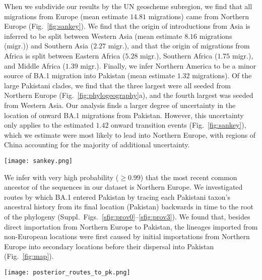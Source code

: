 When we subdivide our results by the UN geoscheme subregion, we find that all migrations from Europe (mean estimate $14.81$ migrations) came from Northern Europe (Fig.~\ref{fig:sankey}).
We find that the origin of introductions from Asia is inferred to be split between Western Asia (mean estimate $8.16$ migrations (migr.)) and Southern Asia ($2.27$ migr.), and that the origin of migrations from Africa is split between Eastern Africa ($5.28$ migr.), Southern Africa ($1.75$ migr.), and Middle Africa ($1.39$ migr.).
Finally, we infer Northern America to be a minor source of BA.1 migration into Pakistan (mean estimate $1.32$ migrations).
Of the large Pakistani clades, we find that the three largest were all seeded from Northern Europe (Fig.~\ref{fig:phylogeography}a), and the fourth largest was seeded from Western Asia.
Our analysis finds a larger degree of uncertainty in the location of onward BA.1 migrations from Pakistan. However, this uncertainty only applies to the estimated $1.42$ onward transition events (Fig.~\ref{fig:sankey}), which we estimate were most likely to lead into Northern Europe, with regions of China accounting for the majority of additional uncertainty.

\begin{figure*}[ht]
   \centering
   \texttt{[image: sankey.png]}
    \caption[BA.1 migration history by location]{Sankey diagram illustrating inferred BA.1 migrations into (mean estimate $35.12$ migrations) and out of (mean estimate $1.42$ migrations) Pakistan. Northern Europe is the source of all inferred migrations to Pakistan from Europe, representing a plurality of importations from both a region and sub-region geographic resolutions.}
    \label{fig:sankey}
\end{figure*}

We infer with very high probability ($ \geq 0.99$) that the most recent common ancestor of the sequences in our dataset is Northern Europe.
We investigated routes by which BA.1 entered Pakistan by tracing each Pakistani taxon's ancestral history from its final location (Pakistan) backwards in time to the root of the phylogeny (Suppl.~Figs.~\ref{sfig:prov0}--\ref{sfig:prov3}).
We found that, besides direct importation from Northern Europe to Pakistan, the lineages imported from non-European locations were first caused by initial importations from Northern Europe into secondary locations before their dispersal into Pakistan (Fig.~\ref{fig:map}).

\begin{figure*}[ht]
    \centering
    \texttt{[image: posterior\_routes\_to\_pk.png]}
     \caption[Pakistan BA.1 map]{Map representing routes by which BA.1 is inferred to enter Pakistan tracing from the most recent common ancestor of our dataset to Pakistani taxa. Inferred migration events that lead directly into Pakistan are represented in dark red, while migrations to a location other than Pakistan that then seed a downstream importation to Pakistan (indirect importations) are illustrated in lighter red.}
     \label{fig:map}
 \end{figure*}

